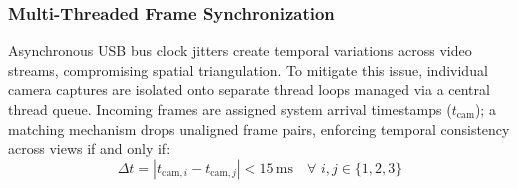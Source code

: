 \subsubsection{Multi-Threaded Frame Synchronization}
Asynchronous USB bus clock jitters create temporal variations across video streams, compromising spatial triangulation. To mitigate this issue, individual camera captures are isolated onto separate thread loops managed via a central thread queue. Incoming frames are assigned system arrival timestamps ($t_{\text{cam}}$); a matching mechanism drops unaligned frame pairs, enforcing temporal consistency across views if and only if:
\begin{equation}
\Delta t = |t_{\text{cam},i} - t_{\text{cam},j}| < 15\,\text{ms} \quad \forall \,\, i,j \in \{1, 2, 3\}
\end{equation}

